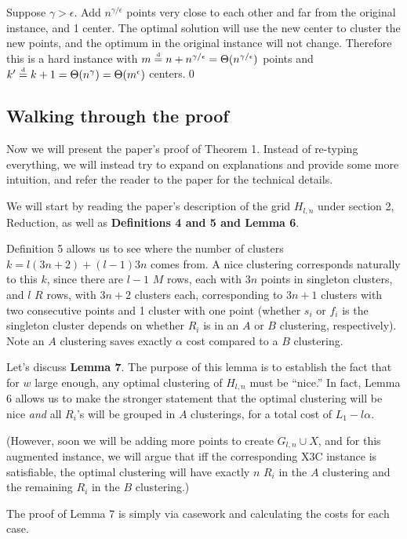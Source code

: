 Suppose $\gamma>\epsilon$. Add $n^{\gamma/\epsilon}$ points very close to each
other and far from the original instance, and 1 center. The optimal solution
will use the new center to cluster the new points, and the optimum in the
original instance will not change. Therefore this is a hard instance with
$m \overset{\text{\tiny d}}{=} n+n^{\gamma/\epsilon}=\Theta(n^{\gamma/\epsilon})$ points and
$k' \overset{\text{\tiny d}}{=} k+1=\Theta(n^\gamma)=\Theta(m^\epsilon)$ centers.\qed

\subsection{Walking through the proof}

Now we will present the paper's proof of Theorem 1. Instead of re-typing everything, we will instead try to expand on explanations and provide some more intuition, and refer the reader to the paper for the technical details.

We will start by reading the paper's description of the grid $H_{l,n}$ under section 2, Reduction, as well as \textbf{Definitions 4 and 5 and Lemma 6}.

Definition 5 allows us to see where the number of clusters $k=l(3n+2)+(l-1)3n$ comes from. A nice clustering corresponds naturally to this $k$, since there are $l-1$ $M$ rows, each with $3n$ points in singleton clusters, and $l$ $R$ rows, with $3n+2$ clusters each, corresponding to $3n+1$ clusters with two consecutive points and 1 cluster with one point (whether $s_i$ or $f_i$ is the singleton cluster depends on whether $R_i$ is in an $A$ or $B$ clustering, respectively). Note an $A$ clustering saves exactly $\alpha$ cost compared to a $B$ clustering.

Let's discuss \textbf{Lemma 7}. The purpose of this lemma is to establish the fact that for $w$ large enough, any optimal clustering of $H_{l,n}$ must be ``nice.'' In fact, Lemma 6 allows us to make the stronger statement that the optimal clustering will be nice \textit{and} all $R_i$'s will be grouped in $A$ clusterings, for a total cost of $L_1-l\alpha$.

(However, soon we will be adding more points to create $G_{l,n}\cup X$, and for this augmented instance, we will argue that iff the corresponding X3C instance is satisfiable, the optimal clustering will have exactly $n$ $R_i$ in the $A$ clustering and the remaining $R_i$ in the $B$ clustering.)

The proof of Lemma 7 is simply via casework and calculating the costs for each case.

